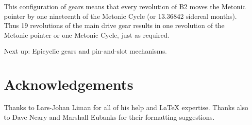 \documentclass[11pt, oneside]{article}   	%
\theoremstyle{definition}
\begin{document}
\bigskip
\noindent
This configuration of gears means that every revolution of B2 moves the Metonic pointer by one nineteenth of the Metonic Cycle (or 13.36842 sidereal months). 
Thus 19 revolutions of the main drive gear results in one revolution of the Metonic pointer or one Metonic Cycle, just as required.

\bigskip
\noindent
Next up: Epicyclic gears and pin-and-slot mechanisms.


\bigskip
\section{Acknowledgements}

Thanks to Lars-Johan Liman for all of his help and LaTeX expertise. Thanks also to Dave Neary and Marshall Eubanks for their formatting suggestions.

\newpage


\end{document}
